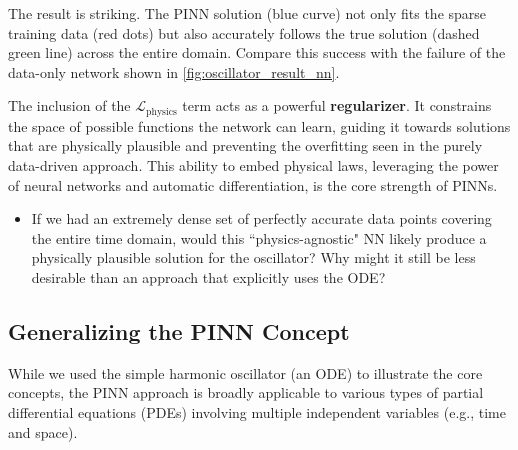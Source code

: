 The result is striking. The PINN solution (blue curve) not only fits the sparse training data (red dots) but also accurately follows the true solution (dashed green line) across the entire domain. Compare this success with the failure of the data-only network shown in \cref{fig:oscillator_result_nn}.

The inclusion of the $\mathcal{L}_{\text{physics}}$ term acts as a powerful \textbf{regularizer}. It constrains the space of possible functions the network can learn, guiding it towards solutions that are physically plausible and preventing the overfitting seen in the purely data-driven approach. This ability to embed physical laws, leveraging the power of neural networks and automatic differentiation, is the core strength of PINNs.

\begin{criticalreflection}
\begin{itemize}
    \item If we had an extremely dense set of perfectly accurate data points covering the entire time domain, would this ``physics-agnostic" NN likely produce a physically plausible solution for the oscillator? Why might it still be less desirable than an approach that explicitly uses the ODE?
\end{itemize}

\end{criticalreflection}

\subsection{Generalizing the PINN Concept}

While we used the simple harmonic oscillator (an ODE) to illustrate the core concepts, the PINN approach is broadly applicable to various types of partial differential equations (PDEs) involving multiple independent variables (e.g., time and space).

